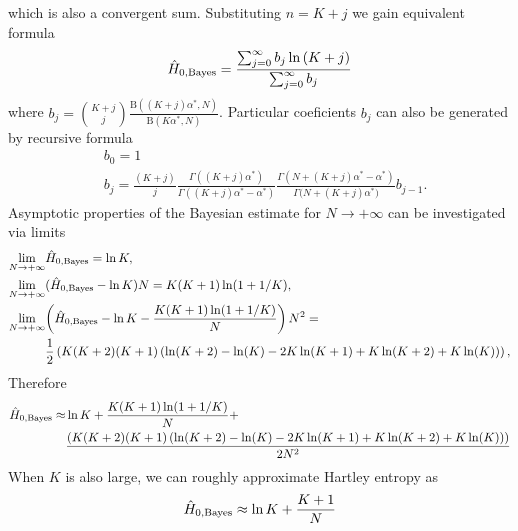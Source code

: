which is also a convergent sum. Substituting $n=K+j$ we gain equivalent formula
\begin{equation} 
\label{eq:hnbayesb}
\hat{H}_{0,\mbox{\scriptsize{Bayes}}} = \frac{\sum_{j=0}^{\infty}{b_{j}\ln{(K+j)}}}{\sum_{j=0}^{\infty}{b_j}}
\end{equation}
where $b_{j}= {K+j \choose j} \frac{\mathrm{B}\left( (K+j)\alpha^{*}, N \right)}{\mathrm{B}\left( K\alpha^{*}, N \right)}$. Particular coeficients $b_{j}$ can also be generated by recursive formula
\begin{equation}
\label{eq:breform}
\begin{split}
& b_{0} = 1 \\
& b_{j} = \frac{(K+j)}{j} \frac{\Gamma{((K+j)\alpha^{*})}}{\Gamma{((K+j)\alpha^{*}-\alpha^{*})}}\frac{\Gamma{(N+(K+j)\alpha^{*} -\alpha^{*})}}{\Gamma({N+(K+j)\alpha^{*})}} b_{j-1}.
\end{split}
\end{equation}
Asymptotic properties of the Bayesian estimate for $N \rightarrow +\infty$ can be investigated via limits
\begin{equation} 
\label{eq:lim}
\begin{split}
\lim_{N \rightarrow +\infty} & {\hat{H}_{0,\mbox{\scriptsize{Bayes}}}} = \ln{K}, \\
\lim_{N \rightarrow +\infty} & {(\hat{H}_{0,\mbox{\scriptsize{Bayes}}}-\ln{K})N} = K(K+1)\ln(1+1/K), \\
\lim_{N \rightarrow +\infty} & {\left(\hat{H}_{0,\mbox{\scriptsize{Bayes}}}-\ln{K}-\frac{K(K+1)\ln(1+1/K)}{N}\right)N^2} = \\
& \frac{1}{2}\left(K(K+2)(K+1)\left(\ln(K+2)-\ln(K)-2K\ln(K+1)+K\ln(K+2)+K\ln(K)\right)\right),
\end{split}
\end{equation}
Therefore
\begin{equation} 
\label{eq:hroz}
\begin{split}
\hat{H}_{0,\mbox{\scriptsize{Bayes}}} \approx & \ln{K} + \frac{K(K+1)\ln(1+1/K)}{N} + \\ 
& \frac{\left(K(K+2)(K+1)\left(\ln(K+2)-\ln(K)-2K\ln(K+1)+K\ln(K+2)+K\ln(K)\right)\right)}{2N^2}
\end{split}
\end{equation}
When $K$ is also large, we can roughly approximate Hartley entropy as
\begin{equation} 
\label{eq:hartapp}
\hat{H}_{0,\mbox{\scriptsize{Bayes}}} \approx \ln{K} + \frac{K+1}{N}
\end{equation}
